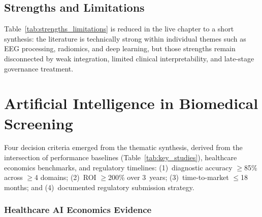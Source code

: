 \subsection{Strengths and Limitations}

Table~\ref{tab:strengths_limitations} is reduced in the live chapter to a short synthesis: the literature is technically strong within individual themes such as EEG processing, radiomics, and deep learning, but those strengths remain disconnected by weak integration, limited clinical interpretability, and late-stage governance treatment.

\section{Artificial Intelligence in Biomedical Screening}

Four decision criteria emerged from the thematic synthesis, derived from the intersection of performance baselines (Table~\ref{tab:key_studies}), healthcare economics benchmarks, and regulatory timelines: (1)~diagnostic accuracy $\geq$85\% across $\geq$4 domains; (2)~ROI $\geq$200\% over 3~years; (3)~time-to-market $\leq$18 months; and (4)~documented regulatory submission strategy.


%

\subsubsection{Healthcare AI Economics Evidence}

